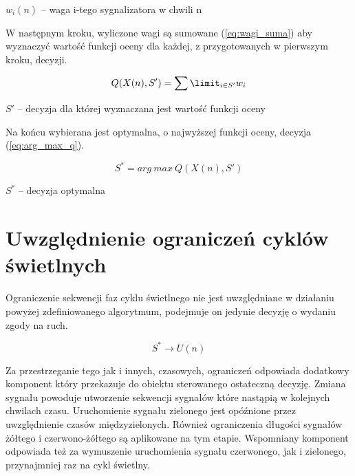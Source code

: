 \begin{math} w_{i} (n) \end{math} \textrm{ -- waga i-tego sygnalizatora w chwili n}

\vspace{0.5cm}
W następnym kroku, wyliczone wagi są sumowane (\ref{eq:wagi_suma}) aby wyznaczyć wartość funkcji oceny dla każdej, z przygotowanych w pierwszym kroku, decyzji.

\begin{equation}
\label{eq:wagi_suma}
	Q (X(n), S') = \sum\limit_{i \in S'} w_{i}
\end{equation}

\begin{math} S' \end{math} \textrm{ -- decyzja dla której wyznaczana jest wartość funkcji oceny}

\vspace{0.5cm}
Na końcu wybierana jest optymalna, o najwyższej funkcji oceny, decyzja (\ref{eq:arg_max_q}).

\begin{equation}
\label{eq:arg_max_q}
	S^{*} = arg\:max\:Q (X(n), S')
\end{equation}

\begin{math} S^{*} \end{math} \textrm{ -- decyzja optymalna}

\section{Uwzględnienie ograniczeń cyklów świetlnych}
Ograniczenie sekwencji faz cyklu świetlnego nie jest uwzględniane w działaniu powyżej zdefiniowanego algorytmum, podejmuje on jedynie decyzję o wydaniu zgody na ruch.

\begin{equation}
	S^{*} \to U(n)
\end{equation}

Za przestrzeganie tego jak i innych, czasowych, ograniczeń odpowiada dodatkowy komponent który przekazuje do obiektu sterowanego ostateczną decyzję. Zmiana sygnału powoduje utworzenie sekwencji sygnałów które nastąpią w kolejnych chwilach czasu. Uruchomienie sygnału zielonego jest opóźnione przez uwzględnienie czasów międzyzielonych. Również ograniczenia długości sygnałów żółtego i czerwono-żółtego są aplikowane na tym etapie. Wspomniany komponent odpowiada też za wymuszenie uruchomienia sygnału czerwonego, jak i zielonego, przynajmniej raz na cykl świetlny.

